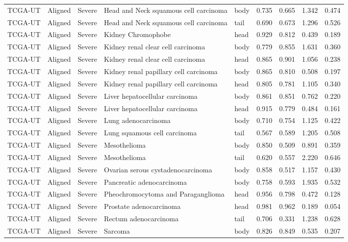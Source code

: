 \begin{longtable}{lllllrrrr}
TCGA-UT & Aligned & Severe & Head and Neck squamous cell carcinoma & body & 0.735 & 0.665 & 1.342 & 0.474 \\
TCGA-UT & Aligned & Severe & Head and Neck squamous cell carcinoma & tail & 0.690 & 0.673 & 1.296 & 0.526 \\
TCGA-UT & Aligned & Severe & Kidney Chromophobe & head & 0.929 & 0.812 & 0.439 & 0.189 \\
TCGA-UT & Aligned & Severe & Kidney renal clear cell carcinoma & body & 0.779 & 0.855 & 1.631 & 0.360 \\
TCGA-UT & Aligned & Severe & Kidney renal clear cell carcinoma & head & 0.865 & 0.901 & 1.056 & 0.238 \\
TCGA-UT & Aligned & Severe & Kidney renal papillary cell carcinoma & body & 0.865 & 0.810 & 0.508 & 0.197 \\
TCGA-UT & Aligned & Severe & Kidney renal papillary cell carcinoma & head & 0.805 & 0.781 & 1.105 & 0.340 \\
TCGA-UT & Aligned & Severe & Liver hepatocellular carcinoma & body & 0.861 & 0.851 & 0.762 & 0.220 \\
TCGA-UT & Aligned & Severe & Liver hepatocellular carcinoma & head & 0.915 & 0.779 & 0.484 & 0.161 \\
TCGA-UT & Aligned & Severe & Lung adenocarcinoma & body & 0.710 & 0.754 & 1.125 & 0.422 \\
TCGA-UT & Aligned & Severe & Lung squamous cell carcinoma & tail & 0.567 & 0.589 & 1.205 & 0.508 \\
TCGA-UT & Aligned & Severe & Mesothelioma & body & 0.850 & 0.509 & 0.891 & 0.359 \\
TCGA-UT & Aligned & Severe & Mesothelioma & tail & 0.620 & 0.557 & 2.220 & 0.646 \\
TCGA-UT & Aligned & Severe & Ovarian serous cystadenocarcinoma & body & 0.858 & 0.517 & 1.157 & 0.430 \\
TCGA-UT & Aligned & Severe & Pancreatic adenocarcinoma & body & 0.758 & 0.593 & 1.935 & 0.532 \\
TCGA-UT & Aligned & Severe & Pheochromocytoma and Paraganglioma & head & 0.956 & 0.798 & 0.472 & 0.128 \\
TCGA-UT & Aligned & Severe & Prostate adenocarcinoma & head & 0.981 & 0.962 & 0.189 & 0.054 \\
TCGA-UT & Aligned & Severe & Rectum adenocarcinoma & tail & 0.706 & 0.331 & 1.238 & 0.628 \\
TCGA-UT & Aligned & Severe & Sarcoma & body & 0.826 & 0.849 & 0.535 & 0.207 \\

\end{longtable}
